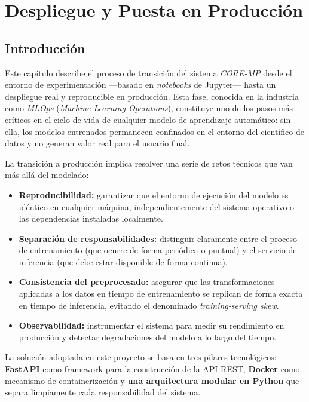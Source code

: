 \chapter{Despliegue y Puesta en Producción}
\label{cap:despliegue}

\section{Introducción}
\label{sec:intro_despliegue}

Este capítulo describe el proceso de transición del sistema \textit{CORE-MP} desde el entorno de experimentación —basado en \textit{notebooks} de Jupyter— hasta un despliegue real y reproducible en producción. Esta fase, conocida en la industria como \textit{MLOps} (\textit{Machine Learning Operations}), constituye uno de los pasos más críticos en el ciclo de vida de cualquier modelo de aprendizaje automático: sin ella, los modelos entrenados permanecen confinados en el entorno del científico de datos y no generan valor real para el usuario final.

La transición a producción implica resolver una serie de retos técnicos que van más allá del modelado:

\begin{itemize}
    \item \textbf{Reproducibilidad:} garantizar que el entorno de ejecución del modelo es idéntico en cualquier máquina, independientemente del sistema operativo o las dependencias instaladas localmente.
    \item \textbf{Separación de responsabilidades:} distinguir claramente entre el proceso de entrenamiento (que ocurre de forma periódica o puntual) y el servicio de inferencia (que debe estar disponible de forma continua).
    \item \textbf{Consistencia del preprocesado:} asegurar que las transformaciones aplicadas a los datos en tiempo de entrenamiento se replican de forma exacta en tiempo de inferencia, evitando el denominado \textit{training-serving skew}.
    \item \textbf{Observabilidad:} instrumentar el sistema para medir su rendimiento en producción y detectar degradaciones del modelo a lo largo del tiempo.
\end{itemize}

La solución adoptada en este proyecto se basa en tres pilares tecnológicos: \textbf{FastAPI} como framework para la construcción de la API REST, \textbf{Docker} como mecanismo de containerización y \textbf{una arquitectura modular en Python} que separa limpiamente cada responsabilidad del sistema.

